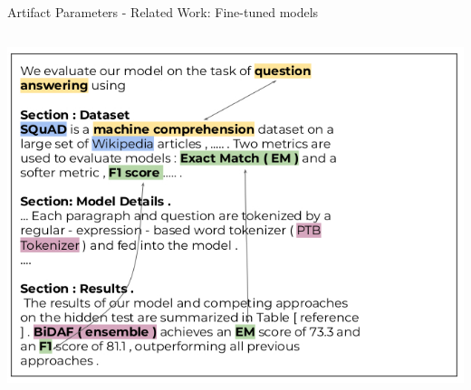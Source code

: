 \documentclass[en,16:9,smallfoot]{sdqbeamer}
\begin{document}
\begin{frame}{Artifact Parameters - Related Work: Fine-tuned models}
\begin{columns}
           \begin{center}\includegraphics[width=\textwidth]{imgs/scirex}\end{center}
   \end{columns}
   \end{frame}
\end{document}
